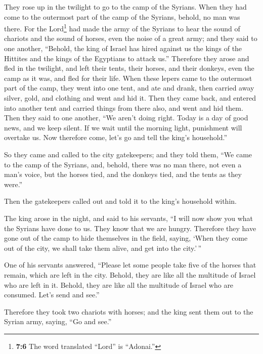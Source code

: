  They rose up in the twilight to go to the camp of the
Syrians. When they had come to the outermost part of the camp of the
Syrians, behold, no man was there.  For the
Lord\footnote{\textbf{7:6} The word translated ``Lord'' is ``Adonai.''}
had made the army of the Syrians to hear the sound of chariots and the
sound of horses, even the noise of a great army; and they said to one
another, ``Behold, the king of Israel has hired against us the kings of
the Hittites and the kings of the Egyptians to attack us.''
 Therefore they arose and fled in the twilight, and left
their tents, their horses, and their donkeys, even the camp as it was,
and fled for their life.  When these lepers came to the
outermost part of the camp, they went into one tent, and ate and drank,
then carried away silver, gold, and clothing and went and hid it. Then
they came back, and entered into another tent and carried things from
there also, and went and hid them.  Then they said to one
another, ``We aren't doing right. Today is a day of good news, and we
keep silent. If we wait until the morning light, punishment will
overtake us. Now therefore come, let's go and tell the king's
household.''

 So they came and called to the city gatekeepers; and
they told them, ``We came to the camp of the Syrians, and, behold, there
was no man there, not even a man's voice, but the horses tied, and the
donkeys tied, and the tents as they were.''

 Then the gatekeepers called out and told it to the
king's household within.

 The king arose in the night, and said to his servants,
``I will now show you what the Syrians have done to us. They know that
we are hungry. Therefore they have gone out of the camp to hide
themselves in the field, saying, `When they come out of the city, we
shall take them alive, and get into the city.'\,''

 One of his servants answered, ``Please let some people
take five of the horses that remain, which are left in the city. Behold,
they are like all the multitude of Israel who are left in it. Behold,
they are like all the multitude of Israel who are consumed. Let's send
and see.''

 Therefore they took two chariots with horses; and the
king sent them out to the Syrian army, saying, ``Go and see.''

